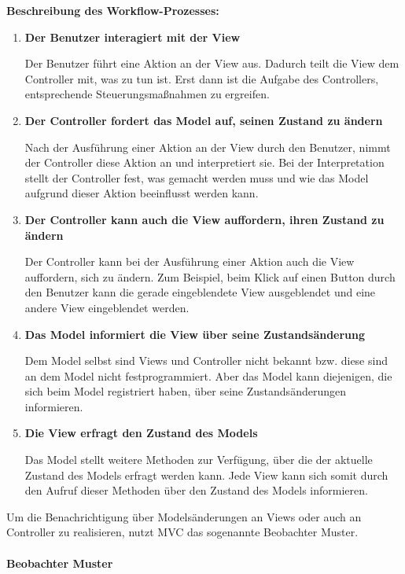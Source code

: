 \textbf{Beschreibung des Workflow-Prozesses:}
\begin{enumerate}
\item \textbf{Der Benutzer interagiert mit der View}

Der Benutzer führt eine Aktion an der View aus. Dadurch teilt die View dem Controller mit, was zu tun ist. Erst dann ist die Aufgabe des Controllers, entsprechende Steuerungsmaßnahmen zu ergreifen.

\item  \textbf{Der Controller fordert das Model auf, seinen Zustand zu ändern}

Nach der Ausführung einer Aktion an der View durch den Benutzer, nimmt der Controller diese Aktion an und interpretiert sie. Bei der Interpretation stellt der Controller fest, was gemacht werden muss und wie das Model aufgrund dieser Aktion beeinflusst werden kann.

\item  \textbf{Der Controller kann auch die View auffordern, ihren Zustand zu ändern}

Der Controller kann bei der Ausführung einer Aktion auch die View auffordern, sich zu ändern. Zum Beispiel, beim Klick auf einen Button durch den Benutzer kann die gerade eingeblendete View ausgeblendet und eine andere View eingeblendet werden.

\item  \textbf{Das Model informiert die View über seine Zustandsänderung}

Dem Model selbst sind Views und Controller nicht bekannt bzw. diese sind an dem Model nicht festprogrammiert. Aber das Model kann diejenigen, die sich beim Model registriert haben, über seine Zustandsänderungen informieren.

\item  \textbf{Die View erfragt den Zustand des Models}

Das Model stellt weitere Methoden zur Verfügung, über die der aktuelle Zustand des Models erfragt werden kann. Jede View kann sich somit durch den Aufruf dieser Methoden über den Zustand des Models informieren.

\end{enumerate}
Um die Benachrichtigung über Modelsänderungen an Views oder auch an Controller zu realisieren, nutzt MVC das sogenannte Beobachter Muster.

\paragraph{Beobachter Muster}\label{observer}

